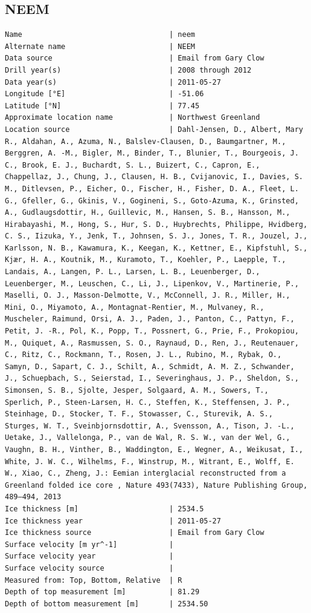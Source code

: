 \documentclass[article,a4paper,times,11pt,twoside]{article}
\begin{document}
\subsection{NEEM}
\label{sec:org6fde51d}
\begin{verbatim}
Name                                  | neem
Alternate name                        | NEEM
Data source                           | Email from Gary Clow
Drill year(s)                         | 2008 through 2012
Data year(s)                          | 2011-05-27
Longitude [°E]                        | -51.06
Latitude [°N]                         | 77.45
Approximate location name             | Northwest Greenland
Location source                       | Dahl-Jensen, D., Albert, Mary R., Aldahan, A., Azuma, N., Balslev-Clausen, D., Baumgartner, M., Berggren, A. -M., Bigler, M., Binder, T., Blunier, T., Bourgeois, J. C., Brook, E. J., Buchardt, S. L., Buizert, C., Capron, E., Chappellaz, J., Chung, J., Clausen, H. B., Cvijanovic, I., Davies, S. M., Ditlevsen, P., Eicher, O., Fischer, H., Fisher, D. A., Fleet, L. G., Gfeller, G., Gkinis, V., Gogineni, S., Goto-Azuma, K., Grinsted, A., Gudlaugsdottir, H., Guillevic, M., Hansen, S. B., Hansson, M., Hirabayashi, M., Hong, S., Hur, S. D., Huybrechts, Philippe, Hvidberg, C. S., Iizuka, Y., Jenk, T., Johnsen, S. J., Jones, T. R., Jouzel, J., Karlsson, N. B., Kawamura, K., Keegan, K., Kettner, E., Kipfstuhl, S., Kjær, H. A., Koutnik, M., Kuramoto, T., Koehler, P., Laepple, T., Landais, A., Langen, P. L., Larsen, L. B., Leuenberger, D., Leuenberger, M., Leuschen, C., Li, J., Lipenkov, V., Martinerie, P., Maselli, O. J., Masson-Delmotte, V., McConnell, J. R., Miller, H., Mini, O., Miyamoto, A., Montagnat-Rentier, M., Mulvaney, R., Muscheler, Raimund, Orsi, A. J., Paden, J., Panton, C., Pattyn, F., Petit, J. -R., Pol, K., Popp, T., Possnert, G., Prie, F., Prokopiou, M., Quiquet, A., Rasmussen, S. O., Raynaud, D., Ren, J., Reutenauer, C., Ritz, C., Rockmann, T., Rosen, J. L., Rubino, M., Rybak, O., Samyn, D., Sapart, C. J., Schilt, A., Schmidt, A. M. Z., Schwander, J., Schuepbach, S., Seierstad, I., Severinghaus, J. P., Sheldon, S., Simonsen, S. B., Sjolte, Jesper, Solgaard, A. M., Sowers, T., Sperlich, P., Steen-Larsen, H. C., Steffen, K., Steffensen, J. P., Steinhage, D., Stocker, T. F., Stowasser, C., Sturevik, A. S., Sturges, W. T., Sveinbjornsdottir, A., Svensson, A., Tison, J. -L., Uetake, J., Vallelonga, P., van de Wal, R. S. W., van der Wel, G., Vaughn, B. H., Vinther, B., Waddington, E., Wegner, A., Weikusat, I., White, J. W. C., Wilhelms, F., Winstrup, M., Witrant, E., Wolff, E. W., Xiao, C., Zheng, J.: Eemian interglacial reconstructed from a Greenland folded ice core , Nature 493(7433), Nature Publishing Group, 489–494, 2013 
Ice thickness [m]                     | 2534.5
Ice thickness year                    | 2011-05-27
Ice thickness source                  | Email from Gary Clow
Surface velocity [m yr^-1]            | 
Surface velocity year                 | 
Surface velocity source               | 
Measured from: Top, Bottom, Relative  | R
Depth of top measurement [m]          | 81.29
Depth of bottom measurement [m]       | 2534.50
\end{verbatim}
\end{document}
